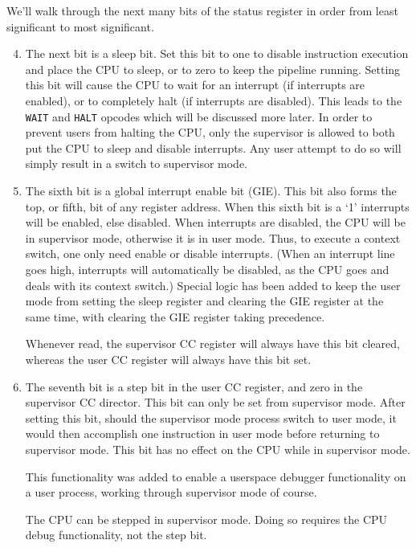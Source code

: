 \documentclass{gqtekspec}
\begin{document}
We'll walk through the next many bits of the status register in order from
least significant to most significant.

\begin{enumerate}
	\setcounter{enumi}{3}
\item The next bit is a sleep bit.  Set this bit to one to disable instruction
	execution and place the CPU to sleep, or to zero to keep the pipeline
	running.  Setting this bit will cause the CPU to wait for an interrupt
	(if interrupts are enabled), or to completely halt (if interrupts are
	disabled).  This leads to the {\tt WAIT} and {\tt HALT} opcodes
	which will be discussed more later.  In order to prevent users from
	halting the CPU, only the supervisor is allowed to both put the CPU to
	sleep and disable interrupts.  Any user attempt to do so will simply
	result in a switch to supervisor mode.

\item The sixth bit is a global interrupt enable bit (GIE).  This bit also
	forms the top, or fifth, bit of any register address.  When this
	sixth bit is a `1' interrupts will be enabled, else disabled.  When 
	interrupts are disabled, the CPU will be in supervisor mode, otherwise
	it is in user mode.  Thus, to execute a context switch, one only
	need enable or disable interrupts.  (When an interrupt line goes
	high, interrupts will automatically be disabled, as the CPU goes
	and deals with its context switch.)  Special logic has been added to
	keep the user mode from setting the sleep register and clearing the
	GIE register at the same time, with clearing the GIE register taking
	precedence.

	Whenever read, the supervisor CC register will always have this bit
	cleared, whereas the user CC register will always have this bit set.

\item The seventh bit is a step bit in the user CC register, and zero in the
	supervisor CC director.  This bit can only be set from supervisor
	mode.  After setting this bit, should the supervisor mode process switch
	to user mode, it would then accomplish one instruction in user mode
	before returning to supervisor mode.  This bit has no effect
	on the CPU while in supervisor mode.

	This functionality was added to enable a userspace debugger
	functionality on a user process, working through supervisor mode
	of course.

	The CPU can be stepped in supervisor mode.  Doing so requires the
	CPU debug functionality, not the step bit.



\end{enumerate}
\end{document}
